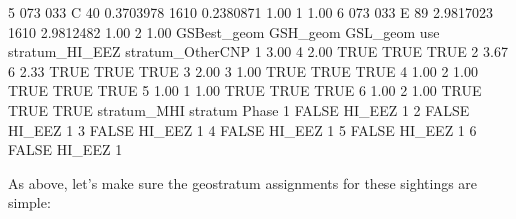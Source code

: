\documentclass[
]{book}
\newenvironment{Shaded}{\begin{snugshade}}{\end{snugshade}}
\newcommand{\ConstantTok}[1]{\textcolor[rgb]{0.00,0.00,0.00}{#1}}
\newcommand{\DecValTok}[1]{\textcolor[rgb]{0.00,0.00,0.81}{#1}}
\newcommand{\FloatTok}[1]{\textcolor[rgb]{0.00,0.00,0.81}{#1}}
\newcommand{\NormalTok}[1]{#1}
\newcommand{\OtherTok}[1]{\textcolor[rgb]{0.56,0.35,0.01}{#1}}
\newcommand{\SpecialCharTok}[1]{\textcolor[rgb]{0.00,0.00,0.00}{#1}}
\newcommand{\StringTok}[1]{\textcolor[rgb]{0.31,0.60,0.02}{#1}}
\begin{document}
\begin{Shaded}
\begin{Highlighting}[]
\DecValTok{5}     \DecValTok{073}     \DecValTok{033}\NormalTok{      C    }\DecValTok{40} \FloatTok{0.3703978}   \DecValTok{1610} \FloatTok{0.2380871}   \FloatTok{1.00}   \DecValTok{1} \FloatTok{1.00}
\DecValTok{6}     \DecValTok{073}     \DecValTok{033}\NormalTok{      E    }\DecValTok{89} \FloatTok{2.9817023}   \DecValTok{1610} \FloatTok{2.9812482}   \FloatTok{1.00}   \DecValTok{2} \FloatTok{1.00}
\NormalTok{  GSBest\_geom GSH\_geom GSL\_geom  use stratum\_HI\_EEZ stratum\_OtherCNP}
\DecValTok{1}        \FloatTok{3.00}        \DecValTok{4}     \FloatTok{2.00} \ConstantTok{TRUE}           \ConstantTok{TRUE}             \ConstantTok{TRUE}
\DecValTok{2}        \FloatTok{3.67}        \DecValTok{6}     \FloatTok{2.33} \ConstantTok{TRUE}           \ConstantTok{TRUE}             \ConstantTok{TRUE}
\DecValTok{3}        \FloatTok{2.00}        \DecValTok{3}     \FloatTok{1.00} \ConstantTok{TRUE}           \ConstantTok{TRUE}             \ConstantTok{TRUE}
\DecValTok{4}        \FloatTok{1.00}        \DecValTok{2}     \FloatTok{1.00} \ConstantTok{TRUE}           \ConstantTok{TRUE}             \ConstantTok{TRUE}
\DecValTok{5}        \FloatTok{1.00}        \DecValTok{1}     \FloatTok{1.00} \ConstantTok{TRUE}           \ConstantTok{TRUE}             \ConstantTok{TRUE}
\DecValTok{6}        \FloatTok{1.00}        \DecValTok{2}     \FloatTok{1.00} \ConstantTok{TRUE}           \ConstantTok{TRUE}             \ConstantTok{TRUE}
\NormalTok{  stratum\_MHI stratum Phase}
\DecValTok{1}       \ConstantTok{FALSE}\NormalTok{  HI\_EEZ     }\DecValTok{1}
\DecValTok{2}       \ConstantTok{FALSE}\NormalTok{  HI\_EEZ     }\DecValTok{1}
\DecValTok{3}       \ConstantTok{FALSE}\NormalTok{  HI\_EEZ     }\DecValTok{1}
\DecValTok{4}       \ConstantTok{FALSE}\NormalTok{  HI\_EEZ     }\DecValTok{1}
\DecValTok{5}       \ConstantTok{FALSE}\NormalTok{  HI\_EEZ     }\DecValTok{1}
\DecValTok{6}       \ConstantTok{FALSE}\NormalTok{  HI\_EEZ     }\DecValTok{1}
\end{Highlighting}
\end{Shaded}

As above, let's make sure the geostratum assignments for these sightings are simple:

\begin{Shaded}
\end{Shaded}
\end{document}
